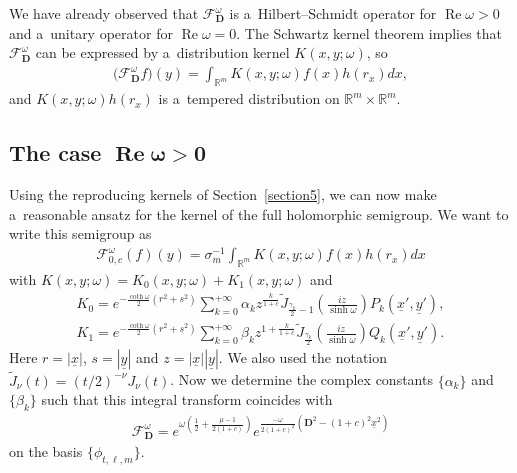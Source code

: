 \documentclass[11pt]{article}
\numberwithin{equation}{section}
\numberwithin{theorem}{section}
\numberwithin{proposition}{section}
\numberwithin{lemma}{section}
\numberwithin{corollary}{section}
\numberwithin{definition}{section}
\numberwithin{example}{section}
\numberwithin{remark}{section}
\numberwithin{note}{section}
\theoremstyle{remark}
\newcommand{\mR}{\mathbb{R}}
\newcommand{\cF}{\mathcal{F}}
\newcommand{\dD}{\textbf{D}}
\newcommand{\ux}{\underline{x}}
\newcommand{\uy}{\underline{y}}
\def\o{{\omega}}
\begin{document}
We have already observed that $\cF_{\dD}^{\o}$ is a~Hilbert--Schmidt operator
for $\operatorname{Re}\o>0$ and a~unitary operator for $\operatorname{Re}\o=0$.
The Schwartz kernel theorem implies
that $\cF_{\dD}^{\o}$ can be expressed by a~distribution kernel
$K(x,y;\omega)$, so
\begin{gather*}
\big(\cF_{\dD}^{\o}f\big)(y)=\int_{\mR^m}K(x,y;\omega)f(x)h(r_{x})dx,
\end{gather*}
and $K(x,y;\omega)h(r_{x})$ is a~tempered distribution
on $\mR^m\times\mR^m$.

\subsection[The case $\operatorname{Re}\o>0$]{The case $\boldsymbol{\operatorname{Re}\o>0}$}

Using the reproducing kernels of Section~\ref{section5}, we can now make a~reasonable ansatz for
the kernel of the full holomorphic semigroup.
We want to write this semigroup as
\begin{gather*}
\cF_{0,c}^{\o}(f)(y)=\sigma_{m}^{-1}\int_{\mR^{m}}K(x,y;\omega)f(x)h(r_{x})dx
\end{gather*}
with $K(x,y;\omega)=K_{0}(x,y;\omega)+K_{1}(x,y;\omega)$ and
\begin{gather}
K_{0} = e^{-\frac{\coth{\o}}{2} (r^{2}+ s^{2})}\sum_{k=0}^{+\infty} \alpha_{k} z^{\frac{k}{1+c}}
\widetilde{J}_{\frac{\gamma_{k}}{2} -1}\left(\frac{iz}{\sinh{\o}}\right) P_{k}(\ux', \uy'),\nonumber\\
K_{1} = e^{-\frac{\coth{\o}}{2} (r^{2}+ s^{2})} \sum_{k=0}^{+\infty} \beta_{k} z^{1+\frac{k}{1+c}}
\widetilde{J}_{\frac{\gamma_{k}}{2}}\left(\frac{iz}{\sinh{\o}}\right) Q_{k}(\ux', \uy').\label{seriessemigroup}
\end{gather}
Here $r=|\ux|$, $s=|\uy|$ and $z=|\ux||\uy|$.
We also used the notation $\widetilde{J}_{\nu}(t)=(t/2)^{-\nu}J_{\nu}(t)$.
Now we determine the complex constants $\{\alpha_{k}\}$ and $\{\beta_{k}\}$ such that this
integral transform coincides with
\begin{gather*}
\cF_{\dD}^{\o}=e^{\o\left(\frac{1}{2}+\frac{\mu-1}{2(1+c)}\right)}e^{\frac{-\o}{
2(1+c)^{2}}\left(\dD^{2}-(1+c)^{2}\ux^{2}\right)}
\end{gather*}
on the basis $\{\phi_{t,\ell,m}\}$.
\end{document}
